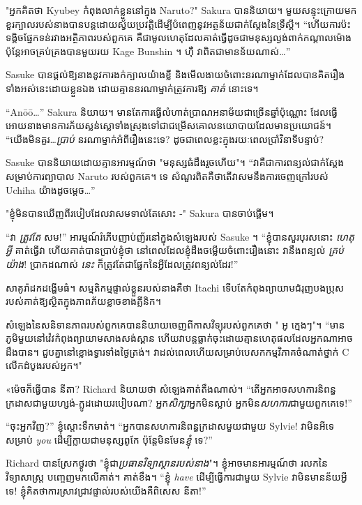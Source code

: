 "អ្នកគិតថា Kyubey កំពុងលាក់ខ្លួននៅក្នុង Naruto?" Sakura បាននិយាយ។ មួយ​សន្ទុះ​ក្រោយ​មក ខួរក្បាល​របស់​នាង​បាន​បន្ត​ដោយ​ស្វ័យ​ប្រវត្តិ​ដើម្បី​បំពេញ​នូវ​អត្ថន័យ​ជាក់ស្តែង​នៃ​ទ្រឹស្តី។ “ហើយការប៉ះទង្គិចផ្នែកទន់រវាងអត្ថិភាពរបស់ពួកគេ គឺជាមូលហេតុដែលគាត់ធ្វើដូចជាមនុស្សល្ងង់ពាក់កណ្តាលម៉ោង ប៉ុន្តែអាចគ្រប់គ្រងបានមួយរយ Kage Bunshin ។ ហ៊ឺ វាពិតជាមានន័យណាស់…”

Sasuke បានផ្តល់ឱ្យនាងនូវការងក់ក្បាលយ៉ាងខ្លី និងមើលងាយចំពោះនរណាម្នាក់ដែលបានគិតរឿងទាំងអស់នេះដោយខ្លួនឯង ដោយគ្មាននរណាម្នាក់ត្រូវការឱ្យ \emph{គាត់} នោះទេ។

“Anōō…” Sakura និយាយ។ មានតែការធ្វើលំហាត់ប្រាណអនាម័យជាច្រើនឆ្នាំប៉ុណ្ណោះ ដែលធ្វើអោយនាងមានការភ័យស្លន់ស្លោទាំងស្រុងទៅជាជម្រើសគោលនយោបាយដែលមានប្រយោជន៍។ “យើងមិនគួរ…\emph{ប្រាប់} នរណាម្នាក់អំពីរឿងនេះទេ? ដូច​ជា​ពេល​ខ្លះ​ក្នុង​រយៈ​ពេល​ប្រាំ​វិនាទី​បន្ទាប់?

Sasuke បាន​និយាយ​ដោយ​គ្មាន​អារម្មណ៍​ថា "មនុស្ស​ធំ​ដឹង​រួច​ហើយ"។ “វាគឺជាការពន្យល់ជាក់ស្តែងសម្រាប់ការព្យាបាល Naruto របស់ពួកគេ។ ទេ សំណួរពិតគឺថាតើវាសមនឹងការចេញក្រៅរបស់ Uchiha យ៉ាងដូចម្តេច…”

"ខ្ញុំមិនបានឃើញពីរបៀបដែលវាសមទាល់តែសោះ -" Sakura បានចាប់ផ្តើម។

“វា \emph{ត្រូវតែ} សម!” អារម្មណ៍រំភើបញាប់ញ័រនៅក្នុងសំឡេងរបស់ Sasuke ។ “ខ្ញុំបានសួរបុរសនោះ \emph{ហេតុអ្វី} គាត់ធ្វើវា ហើយគាត់បានប្រាប់ខ្ញុំថា នៅពេលដែលខ្ញុំដឹងចម្លើយចំពោះរឿងនោះ វានឹងពន្យល់ \emph{គ្រប់យ៉ាង}! ប្រាកដណាស់ \emph{នេះ} ក៏ត្រូវតែជាផ្នែកនៃអ្វីដែលត្រូវពន្យល់ដែរ!”

សាគូរ៉ាដកដង្ហើមធំ។ សម្មតិកម្មផ្ទាល់ខ្លួនរបស់នាងគឺថា Itachi ទើបតែកំពុងព្យាយាមជំរុញបងប្រុសរបស់គាត់ឱ្យស្ថិតក្នុងភាពភ័យខ្លាចខាងគ្លីនិក។

សំឡេង​នៃ​សនិទានភាព​របស់​ពួក​គេ​បាន​និយាយ​ចេញ​ពី​កាស​វិទ្យុ​របស់​ពួក​គេ​ថា "​ អូ ក្មេងៗ"។ “មាន​ភូមិ​មួយ​នៅ​វ៉េវ​កំពុង​ព្យាយាម​សាងសង់​ស្ពាន ហើយ​វា​បន្ត​ធ្លាក់​ចុះ​ដោយ​គ្មាន​ហេតុផល​ដែល​អ្នក​ណា​អាច​ដឹង​បាន។ ជួបគ្នានៅខ្លោងទ្វារទាំងថ្ងៃត្រង់។ វាដល់ពេលហើយសម្រាប់បេសកកម្មវិភាគចំណាត់ថ្នាក់ C លើកដំបូងរបស់អ្នក។"

\clearpage
{}

«ម៉េចក៏ធ្វើបាន នីតា? Richard និយាយ​ថា សំឡេង​គាត់​តឹង​ណាស់។ “តើ​អ្នក​អាច​សហការ​និពន្ធ​ក្រដាស​ជាមួយ​ហ្សង់-ក្លូដ​ដោយ​របៀប​ណា? អ្នក\emph{សិក្សា}អ្នកមិនស្លាប់ អ្នកមិន\emph{សហការ}ជាមួយពួកគេទេ!”

“ចុះអ្នកវិញ?” ខ្ញុំស្ដោះទឹកមាត់។ “អ្នក​បាន​សហការ​និពន្ធ​ក្រដាស​មួយ​ជាមួយ Sylvie! វាមិនអីទេសម្រាប់ \emph{you} ដើម្បីក្លាយជាមនុស្សពូកែ ប៉ុន្តែមិនមែន\emph{ខ្ញុំ} ទេ?”

Richard បានស្រែកថ្ងូរថា "ខ្ញុំជា\emph{ប្រធានវិទ្យាស្ថានរបស់នាង}"។ ខ្ញុំអាចមានអារម្មណ៍ថា រលកនៃវិទ្យាសាស្រ្ត បញ្ចេញមកលើគាត់។ គាត់ខឹង។ “ខ្ញុំ \emph{have} ដើម្បីធ្វើការជាមួយ Sylvie វាមិនមានន័យអ្វីទេ! ខ្ញុំ​គិត​ថា​ការ​ស្រាវ​ជ្រាវ​ផ្ទាល់​របស់​យើង​គឺ​ពិសេស នីតា!”

